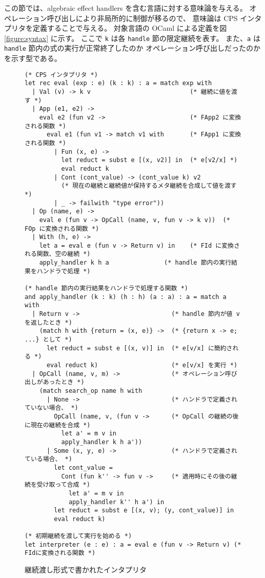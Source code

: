 この節では、algebraic effect handlers を含む言語に対する意味論を与える。
オペレーション呼び出しにより非局所的に制御が移るので、
意味論は CPS インタプリタを定義することで与える。
対象言語の OCaml による定義を図 \ref{figure:syntax} に示す。
ここで \texttt{k} は各 \texttt{handle} 節の限定継続を表す。
また、\texttt{a} は \texttt{handle} 節内の式の実行が正常終了したのか
オペレーション呼び出しだったのかを示す型である。

\begin{figure}
\begin{spacing}{0.9}
\begin{verbatim}
(* CPS インタプリタ *)
let rec eval (exp : e) (k : k) : a = match exp with
  | Val (v) -> k v                           (* 継続に値を渡す *)
  | App (e1, e2) ->
    eval e2 (fun v2 ->                       (* FApp2 に変換される関数 *)
      eval e1 (fun v1 -> match v1 with       (* FApp1 に変換される関数 *)
        | Fun (x, e) ->
          let reduct = subst e [(x, v2)] in  (* e[v2/x] *)
          eval reduct k
        | Cont (cont_value) -> (cont_value k) v2
          (* 現在の継続と継続値が保持するメタ継続を合成して値を渡す *)
        | _ -> failwith "type error"))
  | Op (name, e) ->
    eval e (fun v -> OpCall (name, v, fun v -> k v))  (* FOp に変換される関数 *)
  | With (h, e) ->
    let a = eval e (fun v -> Return v) in    (* FId に変換される関数、空の継続 *)
    apply_handler k h a               (* handle 節内の実行結果をハンドラで処理 *)

(* handle 節内の実行結果をハンドラで処理する関数 *)
and apply_handler (k : k) (h : h) (a : a) : a = match a with
  | Return v ->                         (* handle 節内が値 v を返したとき *)
    (match h with {return = (x, e)} ->  (* {return x -> e; ...} として *)
      let reduct = subst e [(x, v)] in  (* e[v/x] に簡約される *)
      eval reduct k)                    (* e[v/x] を実行 *)
  | OpCall (name, v, m) ->              (* オペレーション呼び出しがあったとき *)
    (match search_op name h with
      | None ->                         (* ハンドラで定義されていない場合、 *)
        OpCall (name, v, (fun v ->      (* OpCall の継続の後に現在の継続を合成 *)
          let a' = m v in
          apply_handler k h a'))
      | Some (x, y, e) ->               (* ハンドラで定義されている場合、 *)
        let cont_value =
          Cont (fun k'' -> fun v ->     (* 適用時にその後の継続を受け取って合成 *)
            let a' = m v in
            apply_handler k'' h a') in
        let reduct = subst e [(x, v); (y, cont_value)] in
        eval reduct k)

(* 初期継続を渡して実行を始める *)
let interpreter (e : e) : a = eval e (fun v -> Return v) (* FIdに変換される関数 *)
\end{verbatim}
\caption{継続渡し形式で書かれたインタプリタ}
\label{figure:1cps}
\end{spacing}
\end{figure}

